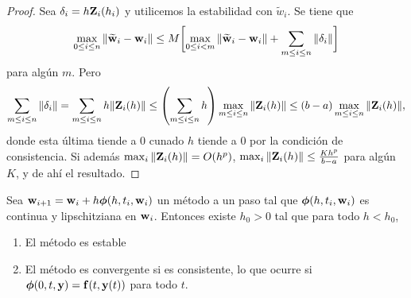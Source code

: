 \begin{proof}
    Sea $\delta_i = h\vb{Z}{}_i(h_i)$ y utilicemos la estabilidad con $\tilde{w}_i$.
    Se tiene que
    \begin{equation*}
        \max_{0 \le i \le n}\norm{\vb{\widetilde{w}}{}_i - \vb{w}{}_i} \le M\qty\bigg[
            \max_{0 \le i < m}\norm{\vb{\widetilde{w}}{}_i - \vb{w}{}_i}
            + \sum_{m\le i \le n}\norm{\delta_i}
        ]
    \end{equation*}
    para algún $m$. Pero
    \begin{equation*}
        \sum_{m \le i \le n} \norm{\delta_i} =
        \sum_{m \le i \le n} h\norm{\vb{Z}{}_i(h)} \le
        \qty(\sum_{m \le i \le n} h)
            \max_{m \le i \le n}\norm{\vb{Z}{}_i(h)} \le
        (b-a)\max_{m \le i \le n}\norm{\vb{Z}{}_i(h)},
    \end{equation*}
    donde esta última tiende a $0$ cunado $h$ tiende a $0$
    por la condición de consistencia.
    Si además $\max_i\norm{\vb{Z}{}_i(h)} = O(h^p)$,
    $\max_i\norm{\vb{Z}{}_i(h)} \le \frac{Kh^p}{b-a}$ para algún $K$,
    y de ahí el resultado.
\end{proof}

\begin{theorem}
    Sea $\vb{w}{}_{i+1} = \vb{w}{}_i + h\vb*{\phi}{}(h, t_i, \vb{w}{}_i)$ un método a un paso tal que
    $\vb*{\phi}{}(h, t_i, \vb{w}{}_i)$ es continua y lipschitziana en $\vb{w}{}_i$.
    Entonces existe $h_0 > 0$ tal que para todo $h < h_0$,
    \begin{enumerate}
        \item El método es estable
        \item El método es convergente si es consistente,
        lo que ocurre si $\vb*{\phi}{}(0, t, \vb{y}{}) = \vb{f}{}(t, \vb{y}{}(t))$ para todo $t$.
    \end{enumerate}
\end{theorem}

